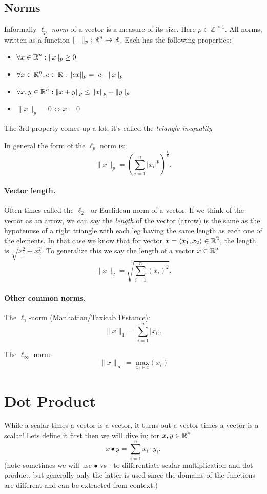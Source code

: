 \subsection{Norms}
Informally \emph{$\ell_p$ norm} of a vector is a measure of its size.
Here $p\in\mathbb{Z}^{\ge1}$.  
All norms, written as a function $\|\_\|_p: \operatorname{\mathbb{R}}^n \mapsto \operatorname{\mathbb{R}}$.
Each has the following properties:
\begin{itemize}
\item $\forall x \in \operatorname{\mathbb{R}}^n : \|x\|_p\ge 0$
\item $\forall x \in \operatorname{\mathbb{R}}^n, c\in\operatorname{\mathbb{R}} : \|cx\|_p = |c|\cdot\|x\|_p$ 
\item $\forall x,y \in \operatorname{\mathbb{R}}^n : \|x+y\|_p\le \|x\|_p + \|y\|_p$
\item $\|x\|_p = 0 \iff x=0$
\end{itemize}

The 3rd property comes up a lot, it's called the \emph{triangle inequality}

In general the form of the $\ell_p$ norm is:
\[
\|x\|_p = \left(\sum_{i=1}^n \left|x_i\right|^p\right)^{\frac{1}{p}}.
\]



\paragraph{Vector length.} Often times called the $\ell_2$- or Euclidean-norm of a vector. 
If we think of the vector as an arrow, we can say the \emph{length} of the vector (arrow) is the same as the hypotenuse 
of a right triangle with each leg having the same length as each one of the elements. 
In that case we know that for vector $x = \left\langle x_1,x_2\right\rangle\in\operatorname{\mathbb{R}}^2$, the length is $\sqrt{x_1^2 + x_2^2}$.
To generalize this we say the length of a vector $x\in\operatorname{\mathbb{R}}^n$
\[
\|x\|_2 = \sqrt{\sum_{i=1}^n \left(x_i\right)^2}.
\]

\paragraph{Other common norms.}
The $\ell_1$-norm (Manhattan/Taxicab Distance):
\[
\|x\|_1 = \sum_{i=1}^n \left|x_i\right|.
\]

The $\ell_\infty$-norm: 
\[
\|x\|_\infty = \max_{x_i \in x} \big(\left|x_i\right|\big)
\]


\section{Dot Product}
While a scalar times a vector is a vector, it turns out a vector times a vector is a scalar! 
Lets define it first then we will dive in;
for $x,y \in \operatorname{\mathbb{R}}^n$
\[
x \bullet y = \sum_{i=1}^n x_i \cdot y_i.
\]
(note sometimes we will use $\bullet$ vs $\cdot$ to differentiate scalar multiplication and dot product, but generally only the latter is used since the domains of the functions are different and can be extracted from context.)

